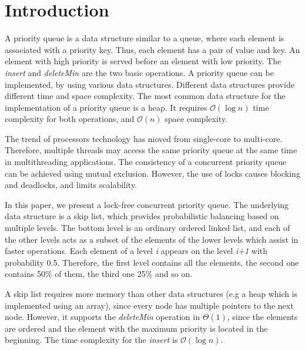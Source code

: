 \section{Introduction}\label{sec:intro}


A priority queue is a data structure similar to a queue, where each element is associated with a priority key.
Thus, each element has a pair of value and key.
An element with high priority is served before an element with low priority.
The \textit{insert} and \textit{deleteMin} are the two basic operations.
A priority queue can be implemented, by using various data structures.
Different data structures provide different time and space complexity.
The most common data structure for the implementation of a priority queue is a heap.
It requires $\mathcal{O}(\log{}n)$ time complexity for both operations, and $\mathcal{O}(n)$ space complexity.


The trend of processors technology has moved from single-core to multi-core.
Therefore, multiple threads may access the same priority queue at the same time in multithreading applications.
The consistency of a concurrent priority queue can be achieved using mutual exclusion.
However, the use of locks causes blocking and deadlocks, and limits scalability.

In this paper, we present a lock-free concurrent priority queue.
The underlying data structure is a skip list, which provides probabilistic balancing based on multiple levels.
The bottom level is an ordinary ordered linked list, and each of the other levels acts as a subset of the elements of the lower levels which assist in faster operations.
Each element of a level \textit{i} appears on the level \textit{i+1} with probability 0.5.
Therefore, the first level contains all the elements, the second one contains 50\% of them, the third one 25\% and so on.

A skip list requires more memory than other data structures (e.g a heap which is implemented using an array), since every node has multiple pointers to the next node.
However, it supports the \textit{deleteMin} operation in $\Theta(1)$, since the elements are ordered and the element with the maximum priority is located in the beginning.
The time complexity for the \textit{insert} is $\mathcal{O}(\log{}n)$.

